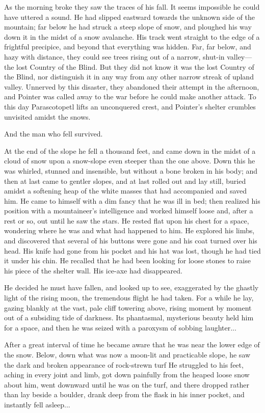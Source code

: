 \documentclass[courier]{sffms}
\begin{document}
As the morning broke they saw the traces of his fall. It seems
impossible he could have uttered a sound. He had slipped eastward
towards the unknown side of the mountain; far below he had struck a
steep slope of snow, and ploughed his way down it in the midst of a
snow avalanche. His track went straight to the edge of a frightful
precipice, and beyond that everything was hidden. Far, far below, and
hazy with distance, they could see trees rising out of a narrow,
shut-in valley---the lost Country of the Blind. But they did not know
it was the lost Country of the Blind, nor distinguish it in any way
from any other narrow streak of upland valley. Unnerved by this
disaster, they abandoned their attempt in the afternoon, and Pointer
was called away to the war before he could make another attack. To
this day Parascotopetl lifts an unconquered crest, and Pointer's
shelter crumbles unvisited amidst the snows.

And the man who fell survived.

At the end of the slope he fell a thousand feet, and came down in the
midst of a cloud of snow upon a snow-slope even steeper than the one
above. Down this he was whirled, stunned and insensible, but without a
bone broken in his body; and then at last came to gentler slopes, and
at last rolled out and lay still, buried amidst a softening heap of
the white masses that had accompanied and saved him. He came to
himself with a dim fancy that he was ill in bed; then realized his
position with a mountaineer's intelligence and worked himself loose
and, after a rest or so, out until he saw the stars. He rested flat
upon his chest for a space, wondering where he was and what had
happened to him. He explored his limbs, and discovered that several of
his buttons were gone and his coat turned over his head. His knife had
gone from his pocket and his hat was lost, though he had tied it under
his chin. He recalled that he had been looking for loose stones to
raise his piece of the shelter wall. His ice-axe had disappeared.

He decided he must have fallen, and looked up to see, exaggerated by
the ghastly light of the rising moon, the tremendous flight he had
taken. For a while he lay, gazing blankly at the vast, pale cliff
towering above, rising moment by moment out of a subsiding tide of
darkness. Its phantasmal, mysterious beauty held him for a space, and
then he was seized with a paroxysm of sobbing laughter...

After a great interval of time he became aware that he was near the
lower edge of the snow. Below, down what was now a moon-lit and
practicable slope, he saw the dark and broken appearance of
rock-strewn turf He struggled to his feet, aching in every joint and
limb, got down painfully from the heaped loose snow about him, went
downward until he was on the turf, and there dropped rather than lay
beside a boulder, drank deep from the flask in his inner pocket, and
instantly fell asleep...
\end{document}
